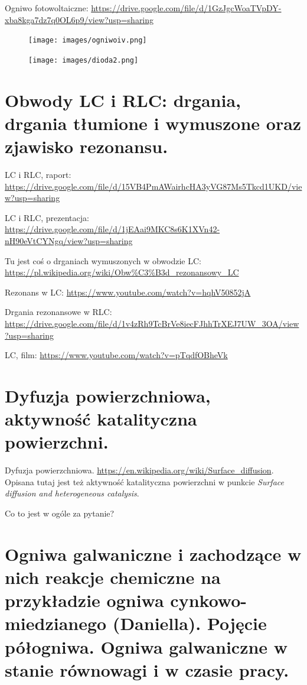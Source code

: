\documentclass{article}
\begin{document}
Ogniwo fotowoltaiczne: \url{https://drive.google.com/file/d/1GzJgcWoaTVpDY-xba8kga7dz7q0OL6p9/view?usp=sharing}

\begin{figure}[H]
    \centering
    \texttt{[image: images/ogniwoiv.png]}
\end{figure}

\begin{figure}[H]
    \centering
    \texttt{[image: images/dioda2.png]}
\end{figure}

\section{Obwody LC i RLC: drgania, drgania tłumione i wymuszone oraz zjawisko rezonansu.}

LC i RLC, raport: \url{https://drive.google.com/file/d/15VB4PmAWairhcHA3yVG87Ms5Tkcd1UKD/view?usp=sharing}

LC i RLC, prezentacja: \url{https://drive.google.com/file/d/1jEAai9MKC8s6K1XVn42-nH90eVtCYNgq/view?usp=sharing}

Tu jest coś o drganiach wymuszonych w obwodzie LC: \url{https://pl.wikipedia.org/wiki/Obw%C3%B3d_rezonansowy_LC}

Rezonans w LC: \url{https://www.youtube.com/watch?v=hqhV50852jA}

Drgania rezonansowe w RLC: \url{https://drive.google.com/file/d/1v4zRh9TcBrVe8iecFJhhTrXEJ7UW_3OA/view?usp=sharing}

LC, film: \url{https://www.youtube.com/watch?v=pTqdfOBheVk}

\section{Dyfuzja powierzchniowa, aktywność katalityczna powierzchni.}
Dyfuzja powierzchniowa. \url{https://en.wikipedia.org/wiki/Surface_diffusion}. Opisana tutaj jest też aktywność katalityczna powierzchni w punkcie \textit{Surface diffusion and heterogeneous catalysis}.

Co to jest w ogóle za pytanie?

\section{Ogniwa galwaniczne i zachodzące w nich reakcje chemiczne na przykładzie ogniwa cynkowo-miedzianego (Daniella). Pojęcie półogniwa. Ogniwa galwaniczne w stanie równowagi i w czasie pracy.}
\end{document}
